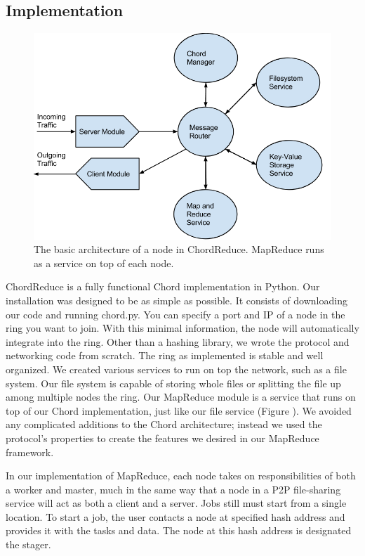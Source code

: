 \documentclass[10pt, conference, compsocconf]{IEEEtran}
\begin{document}
\subsection{Implementation}

\begin{figure}
    \includegraphics[width=\linewidth]{crArch}
    \caption{The basic architecture of a node in ChordReduce.  MapReduce runs as a service on top of each node.}
    \label{crArch}
\end{figure}

ChordReduce is a fully functional Chord implementation in Python.  Our installation was designed to be as simple as possible.  It consists of downloading our code \cite{code} and running chord.py.  You can specify a port and IP of a node in the ring you want to join.  With this minimal information, the node will automatically integrate into the ring.  
Other than a hashing library, we wrote the protocol and networking code from scratch.  The ring as implemented is stable and well organized. We created various services to run on top the network, such as a file system.  Our file system is capable of storing whole files or splitting the file up among multiple nodes the ring. Our MapReduce module is a service that runs on top of our Chord implementation, just like our file service (Figure \cite{crArch}).  We avoided any complicated additions to the Chord architecture; instead we used the protocol's properties to create the features we desired in our MapReduce framework. 
  
In our implementation of MapReduce, each node takes on responsibilities of both a worker and master, much in the same way that a node in a P2P file-sharing service will act as both a client and a server.  Jobs still must start from a single location.  To start a job, the user contacts a node at specified hash address and provides it with the tasks and data.  The node at this hash address is designated the stager. 
\end{document}
